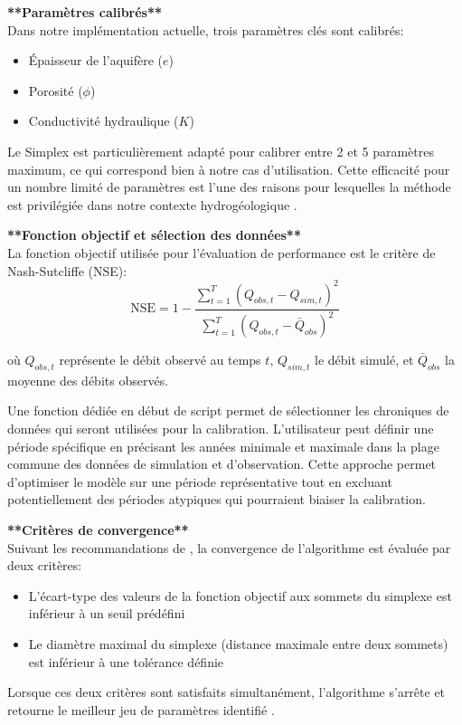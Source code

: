 \vspace{2em}
\noindent\textbf{**Paramètres calibrés**}\\

Dans notre implémentation actuelle, trois paramètres clés sont calibrés:
\begin{itemize}
\item Épaisseur de l'aquifère ($e$)
\item Porosité ($\phi$)
\item Conductivité hydraulique ($K$)
\end{itemize}

Le Simplex est particulièrement adapté pour calibrer entre 2 et 5 paramètres maximum, ce qui correspond bien à notre cas d'utilisation. Cette efficacité pour un nombre limité de paramètres est l'une des raisons pour lesquelles la méthode est privilégiée dans notre contexte hydrogéologique \parencite{gao_implementing_2012}.

\vspace{2em}
\noindent\textbf{**Fonction objectif et sélection des données**}\\

La fonction objectif utilisée pour l'évaluation de performance est le critère de Nash-Sutcliffe (NSE):
\begin{equation}\label{eq:nse}
\text{NSE} = 1 - \frac{\sum_{t=1}^{T}(Q_{obs,t} - Q_{sim,t})^2}{\sum_{t=1}^{T}(Q_{obs,t} - \bar{Q}_{obs})^2}
\end{equation}

où $Q_{obs,t}$ représente le débit observé au temps $t$, $Q_{sim,t}$ le débit simulé, et $\bar{Q}_{obs}$ la moyenne des débits observés.

Une fonction dédiée en début de script permet de sélectionner les chroniques de données qui seront utilisées pour la calibration. L'utilisateur peut définir une période spécifique en précisant les années minimale et maximale dans la plage commune des données de simulation et d'observation. Cette approche permet d'optimiser le modèle sur une période représentative tout en excluant potentiellement des périodes atypiques qui pourraient biaiser la calibration.

\vspace{2em}
\noindent\textbf{**Critères de convergence**}\\

Suivant les recommandations de \textcite{gao_implementing_2012}, la convergence de l'algorithme est évaluée par deux critères:
\begin{itemize}
\item L'écart-type des valeurs de la fonction objectif aux sommets du simplexe est inférieur à un seuil prédéfini
\item Le diamètre maximal du simplexe (distance maximale entre deux sommets) est inférieur à une tolérance définie
\end{itemize}

Lorsque ces deux critères sont satisfaits simultanément, l'algorithme s'arrête et retourne le meilleur jeu de paramètres identifié \parencite{gao_implementing_2012}.
